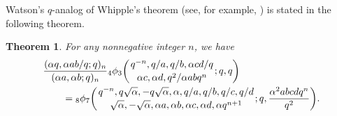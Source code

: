 \documentclass[10pt,a4paper]{amsart}
\numberwithin{equation}{section}
\newtheorem{Theorem}{Theorem}[section]
\begin{document}
Watson's $q$-analog of Whipple's theorem (see, for example, \cite[equation~(2.5.1)]{Gas+Rah}) is stated in the following theorem.
\begin{Theorem}\label{WatsonWhipplethm} For any nonnegative integer $n$, we have
	\begin{align*}%
		&\frac{(\alpha q, \alpha ab/q; q)_n}{(\alpha a, \alpha b; q)_n}
		{_4\phi_3}\biggl({{q^{-n}, q/a, q/b, \alpha cd/q }\atop{\alpha c, \alpha d, q^2/{\alpha ab q^n}}}; q, q\biggr)\\
		&\qquad{}={_8\phi_7}\biggl({{q^{-n}, q\sqrt{\alpha}, -q\sqrt{\alpha}, \alpha, q/a, q/b, q/c, q/d}
			\atop{\sqrt{\alpha}, -\sqrt{\alpha}, \alpha a, \alpha b, \alpha c, \alpha d, \alpha q^{n+1}}}; q, \frac{\alpha^2 abcdq^n}{q^2}\biggr).\nonumber
	\end{align*}
\end{Theorem}
\end{document}

